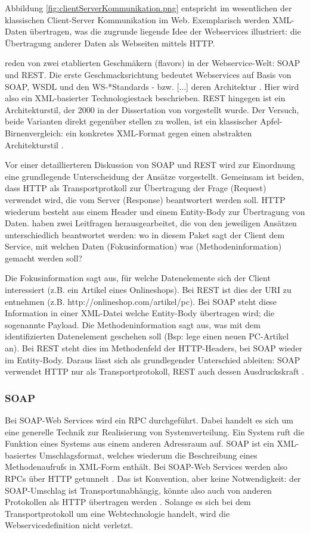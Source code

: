 \documentclass[12pt,a4paper,bibliography=totocnumbered,listof=totoc]{scrartcl}
\begin{document}
Abbildung \ref{fig:clientServerKommunikation.png} entspricht im wesentlichen der klassischen Client-Server Kommunikation im Web. Exemplarisch werden XML-Daten übertragen, was die zugrunde liegende Idee der Webservices illustriert: die Übertragung anderer Daten als Webseiten mittels HTTP.

\citet{wilde11} reden von zwei etablierten \glqq Geschmäkern\grqq{} (flavors) in der Webservice-Welt: SOAP und REST. Die erste Geschmacksrichtung bedeutet Webservices \glqq auf Basis von SOAP, WSDL und den WS-*Standards - bzw. [...] deren Architektur\grqq{} \citep{tilkov11}. Hier wird also ein XML-basierter Technologiestack beschrieben. REST hingegen ist ein Architekturstil, der 2000 in der Dissertation von \citeauthor{fielding00} vorgestellt wurde. Der Versuch, beide Varianten direkt gegenüber stellen zu wollen, ist ein \glqq [...] klassischer Apfel-Birnenvergleich: ein konkretes XML-Format gegen einen abstrakten Architekturstil\grqq{} \citep{tilkov11}.

Vor einer detaillierteren Diskussion von SOAP und REST wird zur Einordnung eine grundlegende Unterscheidung der Ansätze vorgestellt. Gemeinsam ist beiden, dass HTTP als Transportprotkoll zur Übertragung der Frage (Request) verwendet wird, die vom Server (Response) beantwortert werden soll. HTTP wiederum besteht aus einem Header und einem Entity-Body zur Übertragung von Daten. \citet{richardson07} haben zwei Leitfragen herausgearbeitet, die von den jeweiligen Ansätzen unterschiedlich beantwortet werden: wo in diesem Paket sagt der Client dem Service, mit welchen Daten (Fokusinformation) was (Methodeninformation) gemacht werden soll?

Die Fokusinformation sagt aus, für welche Datenelemente sich der Client interessiert (z.B. ein Artikel eines Onlineshops). Bei REST ist dies der URI zu entnehmen (z.B. http://onlineshop.com/artikel/pc). Bei SOAP steht diese Information in einer XML-Datei welche Entity-Body übertragen wird; die sogenannte Payload. Die Methodeninformation sagt aus, was mit dem identifizierten Datenelement geschehen soll (Bsp: lege einen neuen PC-Artikel an). Bei REST steht dies im Methodenfeld der HTTP-Headers, bei SOAP wieder im Entity-Body. Daraus lässt sich als grundlegender Unterschied ableiten: SOAP verwendet HTTP nur als Transportprotokoll, REST auch dessen Ausdruckskraft \citep{wilde11}.

\subsubsection{SOAP}
Bei SOAP-Web Services wird ein \ac{RPC} durchgeführt. Dabei handelt es sich um eine generelle Technik zur Realisierung von Systemverteilung. Ein System ruft die Funktion eines Systems aus einem anderen Adressraum auf. SOAP ist ein XML-basiertes Umschlagsformat, welches wiederum die Beschreibung eines Methodenaufrufs in XML-Form enthält. Bei SOAP-Web Services werden also \ac{RPC}s über HTTP getunnelt \citep{wilde11}. Das ist Konvention, aber keine Notwendigkeit: der SOAP-Umschlag ist Transportunabhängig, könnte also auch von anderen Protokollen als HTTP übertragen werden \citep{tilkov11}. Solange es sich bei dem Transportprotokoll um eine Webtechnologie handelt, wird die Webservicedefinition nicht verletzt.
\end{document}
